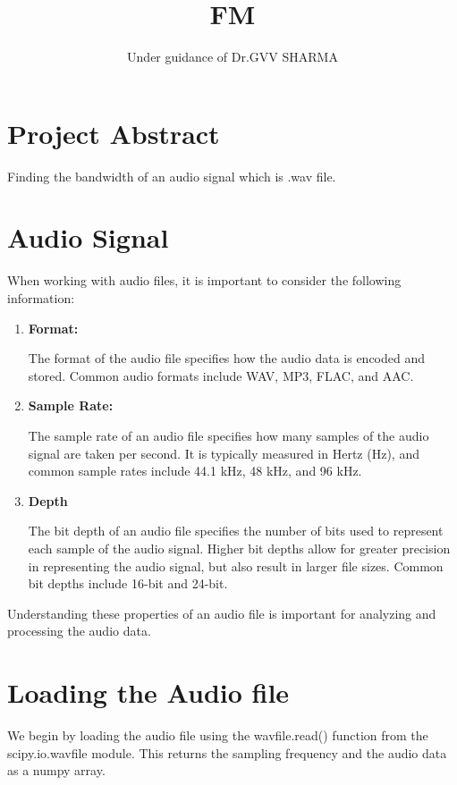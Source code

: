 \documentclass[journal,12pt,twocolumn]{article}
\title{FM}
\author{Under guidance of Dr.GVV SHARMA}
\begin{document}
\maketitle
\tableofcontents

\section{Project Abstract}
Finding the bandwidth of an audio signal which is .wav file.

\section{Audio Signal}
	When working with audio files, it is important to consider the following information:

\begin{enumerate}
\item{\textbf{Format:}

	The format of the audio file specifies how the audio data is encoded and stored. Common audio formats include WAV, MP3, FLAC, and AAC.}
 
\item{\textbf{Sample Rate:}

	The sample rate of an audio file specifies how many samples of the audio signal are taken per second. It is typically measured in Hertz (Hz), and common sample rates include 44.1 kHz, 48 kHz, and 96 kHz.}
 
\item{\textbf{Depth} 

	The bit depth of an audio file specifies the number of bits used to represent each sample of the audio signal. Higher bit depths allow for greater precision in representing the audio signal, but also result in larger file sizes. Common bit depths include 16-bit and 24-bit.}

\end{enumerate}

	Understanding these properties of an audio file is important for analyzing and processing the audio data. 


\section{Loading the Audio file}
	We begin by loading the audio file using the wavfile.read() function from the scipy.io.wavfile module. This returns the sampling frequency and the audio data as a numpy array.
\end{document}

